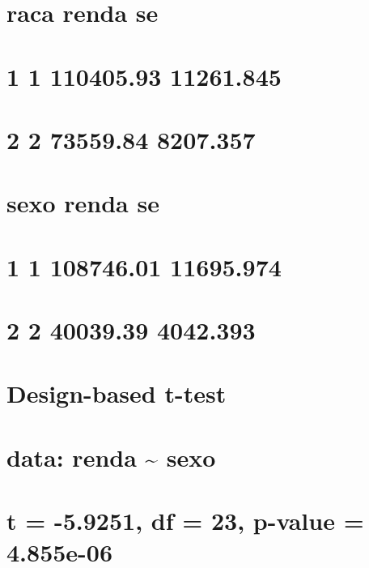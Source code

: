 \documentclass[]{book}
\theoremstyle{definition}
\theoremstyle{definition}
\theoremstyle{definition}
\theoremstyle{remark}
\begin{document}
\section{raca renda se}\label{raca-renda-se}

\section{1 1 110405.93 11261.845}\label{section-32}

\section{2 2 73559.84 8207.357}\label{section-33}

\section{sexo renda se}\label{sexo-renda-se}

\section{1 1 108746.01 11695.974}\label{section-34}

\section{2 2 40039.39 4042.393}\label{section-35}

\section{}\label{section-36}

\section{Design-based t-test}\label{design-based-t-test}

\section{}\label{section-37}

\section{data: renda \textasciitilde{} sexo}\label{data-renda-sexo}

\section{t = -5.9251, df = 23, p-value =
4.855e-06}\label{t--5.9251-df-23-p-value-4.855e-06}
\end{document}

